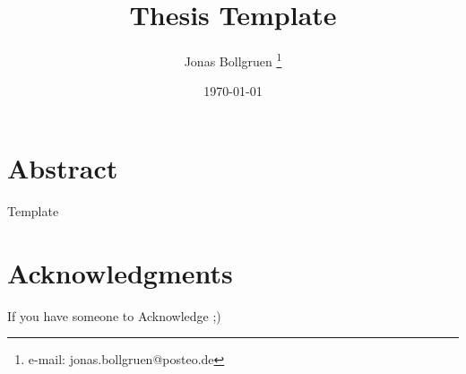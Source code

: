 \documentclass[a4paper,cleardoubleempty,BCOR1cm]{scrbook}
\title{Thesis Template}
\author{Jonas Bollgruen \thanks{e-mail: jonas.bollgruen@posteo.de}}
\date{\today}
\begin{document}


\chapter*{Abstract}
Template

\chapter*{Acknowledgments}
If you have someone to Acknowledge ;)

\tableofcontents




\appendix

%

\end{document}

